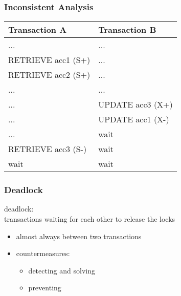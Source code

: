 \documentclass[dvipsnames]{beamer}
\theoremstyle{plain}
\begin{document}
\begin{frame}[fragile]
  \frametitle{Inconsistent Analysis}

  \begin{example}[sum of accounts: acc1=40, acc2=50, acc3=30]
    \begin{table}
      \begin{tabular}{ll}
Transaction A        & Transaction B   \\\hline
...                  & ...             \\\pause
RETRIEVE acc1 (S+)   & ...             \\\pause
RETRIEVE acc2 (S+)   & ...             \\\pause
...                  & ...             \\
...                  & UPDATE acc3 (X+)\\\pause
...                  & UPDATE acc1 (X-)\\
...                  & wait            \\\pause
RETRIEVE acc3 (S-)   & wait            \\
wait                 & wait
      \end{tabular}
    \end{table}
  \end{example}
\end{frame}

\begin{frame}
  \frametitle{Deadlock}

  \begin{definition}
    \alert{deadlock}:\\
      transactions waiting for each other to release the locks
  \end{definition}

  \pause
  \begin{itemize}
    \item almost always between two transactions
    \item countermeasures:
    \begin{itemize}
      \item detecting and solving
      \item preventing
    \end{itemize}
  \end{itemize}
\end{frame}
\end{document}
